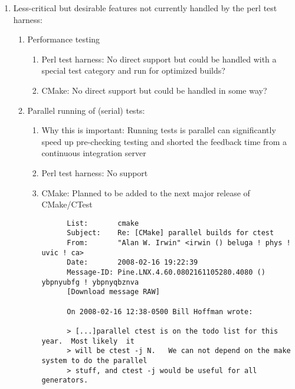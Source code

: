 \documentclass[pdf,ps2pdf,11pt]{SANDreport}
\begin{document}
\begin{enumerate}
\begin{enumerate}
  \end{enumerate}

{}\item Less-critical but desirable features not currently handled by
the perl test harness:

  \begin{enumerate}

  {}\item Performance testing

    \begin{enumerate}

    {}\item Perl test harness: No direct support but could be handled
    with a special test category and run for optimized builds?

    {}\item CMake: No direct support but could be handled in some way?

    \end{enumerate}

  {}\item Parallel running of (serial) tests:

    \begin{enumerate}

    {}\item Why this is important: Running tests is parallel can
    significantly speed up pre-checking testing and shorted the
    feedback time from a continuous integration server

    {}\item Perl test harness: No support

    {}\item CMake: Planned to be added to the next major release of
    CMake/CTest
      
      {\scriptsize\begin{verbatim}
      List:       cmake
      Subject:    Re: [CMake] parallel builds for ctest
      From:       "Alan W. Irwin" <irwin () beluga ! phys ! uvic ! ca>
      Date:       2008-02-16 19:22:39
      Message-ID: Pine.LNX.4.60.0802161105280.4080 () ybpnyubfg ! ybpnyqbznva
      [Download message RAW]
      
      On 2008-02-16 12:38-0500 Bill Hoffman wrote:
      
      > [...]parallel ctest is on the todo list for this year.  Most likely  it 
      > will be ctest -j N.   We can not depend on the make system to do the parallel 
      > stuff, and ctest -j would be useful for all generators.
      

\end{verbatim}}
\end{enumerate}
\end{enumerate}
\end{enumerate}
\end{document}
